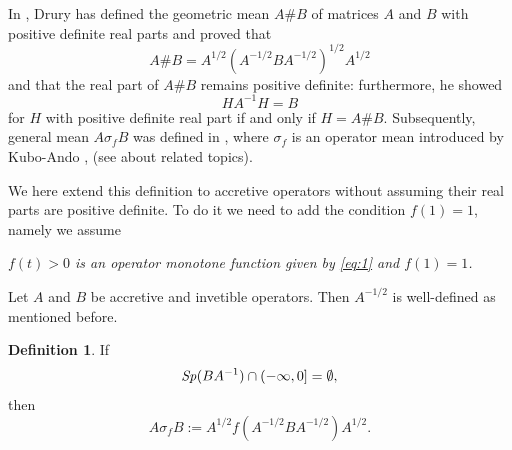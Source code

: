 \documentclass[reqno]{amsart}
\theoremstyle{definition}
\newtheorem{definition}[theorem]{Definition}
\theoremstyle{remark}
\begin{document}
In \cite{Drury},  Drury has defined the geometric mean $A\# B$ of matrices $A$ and 
$B$ with positive definite real parts and proved that
$$A\# B = A^{1/2} (A^{-1/2} B A^{-1/2})^{1/2} A^{1/2}$$
and that the real part of $A\# B$ remains positive definite: furthermore, he showed  
$$H A^{-1} H = B$$
for $H$ with positive definite real part if and only if $H= A\# B$. 
Subsequently, general mean $A\sigma_f B$ was defined in \cite{BKS1}, where 
$\sigma_f$ is an operator mean introduced by Kubo-Ando \cite{K-A},  
(see \cite{Lin, RMF} about related topics).\par 
We here extend this definition to accretive operators without assuming 
their real parts are positive definite. To do it we need to add 
the condition $f(1)=1$, namely we assume 
\begin{center}
\it $f(t)>0$ is an operator monotone function given by \eqref{eq:1} and $f(1)=1$.
\end{center}
\rm
Let $A$ and $B$ be accretive and invetible operators. Then 
$A^{-1/2}$ is well-defined as mentioned before.
\begin{definition}\label{Def:5-2}
If 
\begin{equation}\label{eq:10}
{\it Sp}(BA^{-1}) \cap (-\infty, 0] = \emptyset, 
\end{equation}
then 
\begin{equation}\label{eq:11}
A\sigma_f B:= A^{1/2} f( A^{-1/2} B A^{-1/2}) A^{1/2}.
\end{equation}
\end{definition}
\end{document}
